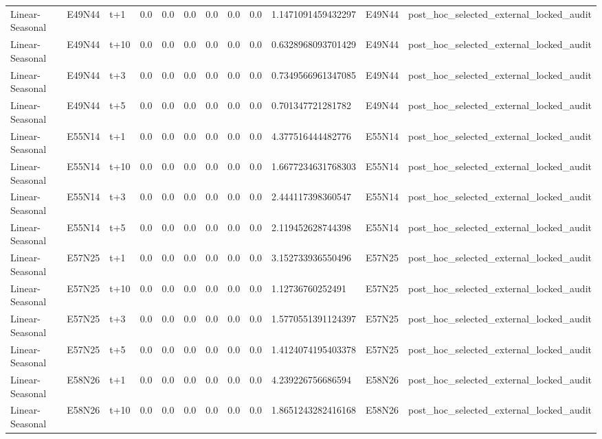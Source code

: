 \begin{landscape}
\begin{longtable}{llllllllllll}
Linear-Seasonal & E49N44 & t+1 & 0.0 & 0.0 & 0.0 & 0.0 & 0.0 & 0.0 & 1.1471091459432297 & E49N44 & post\_hoc\_selected\_external\_locked\_audit \\
Linear-Seasonal & E49N44 & t+10 & 0.0 & 0.0 & 0.0 & 0.0 & 0.0 & 0.0 & 0.6328968093701429 & E49N44 & post\_hoc\_selected\_external\_locked\_audit \\
Linear-Seasonal & E49N44 & t+3 & 0.0 & 0.0 & 0.0 & 0.0 & 0.0 & 0.0 & 0.7349566961347085 & E49N44 & post\_hoc\_selected\_external\_locked\_audit \\
Linear-Seasonal & E49N44 & t+5 & 0.0 & 0.0 & 0.0 & 0.0 & 0.0 & 0.0 & 0.701347721281782 & E49N44 & post\_hoc\_selected\_external\_locked\_audit \\
Linear-Seasonal & E55N14 & t+1 & 0.0 & 0.0 & 0.0 & 0.0 & 0.0 & 0.0 & 4.377516444482776 & E55N14 & post\_hoc\_selected\_external\_locked\_audit \\
Linear-Seasonal & E55N14 & t+10 & 0.0 & 0.0 & 0.0 & 0.0 & 0.0 & 0.0 & 1.6677234631768303 & E55N14 & post\_hoc\_selected\_external\_locked\_audit \\
Linear-Seasonal & E55N14 & t+3 & 0.0 & 0.0 & 0.0 & 0.0 & 0.0 & 0.0 & 2.444117398360547 & E55N14 & post\_hoc\_selected\_external\_locked\_audit \\
Linear-Seasonal & E55N14 & t+5 & 0.0 & 0.0 & 0.0 & 0.0 & 0.0 & 0.0 & 2.119452628744398 & E55N14 & post\_hoc\_selected\_external\_locked\_audit \\
Linear-Seasonal & E57N25 & t+1 & 0.0 & 0.0 & 0.0 & 0.0 & 0.0 & 0.0 & 3.152733936550496 & E57N25 & post\_hoc\_selected\_external\_locked\_audit \\
Linear-Seasonal & E57N25 & t+10 & 0.0 & 0.0 & 0.0 & 0.0 & 0.0 & 0.0 & 1.12736760252491 & E57N25 & post\_hoc\_selected\_external\_locked\_audit \\
Linear-Seasonal & E57N25 & t+3 & 0.0 & 0.0 & 0.0 & 0.0 & 0.0 & 0.0 & 1.5770551391124397 & E57N25 & post\_hoc\_selected\_external\_locked\_audit \\
Linear-Seasonal & E57N25 & t+5 & 0.0 & 0.0 & 0.0 & 0.0 & 0.0 & 0.0 & 1.4124074195403378 & E57N25 & post\_hoc\_selected\_external\_locked\_audit \\
Linear-Seasonal & E58N26 & t+1 & 0.0 & 0.0 & 0.0 & 0.0 & 0.0 & 0.0 & 4.239226756686594 & E58N26 & post\_hoc\_selected\_external\_locked\_audit \\
Linear-Seasonal & E58N26 & t+10 & 0.0 & 0.0 & 0.0 & 0.0 & 0.0 & 0.0 & 1.8651243282416168 & E58N26 & post\_hoc\_selected\_external\_locked\_audit \\

\end{longtable}
\end{landscape}
